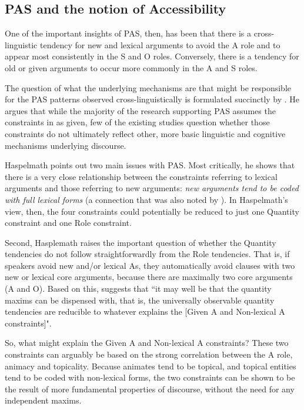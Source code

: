 \subsection{PAS and the notion of Accessibility}\label{accessibilityandpas}

One of the important insights of PAS, then, has been that there is a cross-linguistic tendency for new and lexical arguments to avoid the A role and to appear most consistently in the S and O roles.  Conversely, there is a tendency for old or given arguments to occur more commonly in the A and S roles. 

The question of what the underlying mechanisms are that might be responsible for the PAS patterns observed cross-linguistically is formulated succinctly by \citet[910]{haspelmath2006}. He argues that while the majority of the research supporting PAS assumes the constraints in  as given, few of the existing studies question whether those constraints do not ultimately reflect other, more basic linguistic and cognitive mechanisms underlying discourse. 

Haspelmath points out two main issues with PAS. Most critically, he shows that there is a very close relationship between the constraints referring to lexical arguments and those referring to new arguments: \textit{new arguments tend to be coded with full lexical forms} (a connection that was also noted by \citet[829-830]{dubois1987}). In Haspelmath's view, then, the four constraints could potentially be reduced to just one Quantity constraint and one Role constraint. 

Second, Hasplemath raises the important question of whether the Quantity tendencies do not follow straightforwardly from the Role tendencies. That is, if speakers avoid new and/or lexical As, they automatically avoid clauses with two new or lexical core arguments, because there are maximally two core arguments (A and O). Based on this, \citet[911]{haspelmath2006} suggests that ``it may well be that the quantity maxims can be dispensed with, that is, the universally observable quantity tendencies are reducible to whatever explains the [Given A and Non-lexical A constraints]". 

So, what might explain the Given A and Non-lexical A constraints? These two constraints can arguably be based on the strong correlation between the A role, animacy and topicality. Because animates tend to be topical, and topical entities tend to be coded with non-lexical forms, the two constraints can be shown to be the result of more fundamental properties of discourse, without the need for any independent maxims. 

